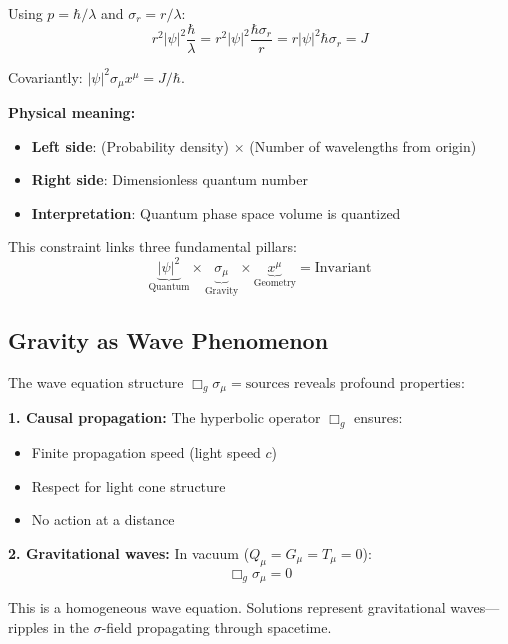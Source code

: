 \documentclass[11pt,a4paper]{article}
\theoremstyle{definition}
\theoremstyle{remark}
\begin{document}
			Using $p = \hbar/\lambda$ and $\sigma_r = r/\lambda$:
			\begin{equation}
				r^2|\psi|^2 \frac{\hbar}{\lambda} = r^2|\psi|^2 \frac{\hbar\sigma_r}{r} = r|\psi|^2\hbar\sigma_r = J
			\end{equation}
			
			Covariantly: $|\psi|^2\sigma_\mu x^\mu = J/\hbar$.
		
		\textbf{Physical meaning:}
		\begin{itemize}
			\item \textbf{Left side}: (Probability density) $\times$ (Number of wavelengths from origin)
			\item \textbf{Right side}: Dimensionless quantum number
			\item \textbf{Interpretation}: Quantum phase space volume is quantized
		\end{itemize}
		
		This constraint links three fundamental pillars:
		\begin{equation}
			\underbrace{|\psi|^2}_{\text{Quantum}} \times \underbrace{\sigma_\mu}_{\text{Gravity}} \times \underbrace{x^\mu}_{\text{Geometry}} = \text{Invariant}
		\end{equation}
		
		\subsection{Gravity as Wave Phenomenon}
		
		The wave equation structure $\Box_g\sigma_\mu = \text{sources}$ reveals profound properties:
		
		\textbf{1. Causal propagation:}
		The hyperbolic operator $\Box_g$ ensures:
		\begin{itemize}
			\item Finite propagation speed (light speed $c$)
			\item Respect for light cone structure
			\item No action at a distance
		\end{itemize}
		
		\textbf{2. Gravitational waves:}
		In vacuum ($Q_\mu = G_\mu = T_\mu = 0$):
		\begin{equation}
			\Box_g\sigma_\mu = 0
		\end{equation}
		
		This is a homogeneous wave equation. Solutions represent gravitational waves—ripples in the $\sigma$-field propagating through spacetime.
		
\end{document}
